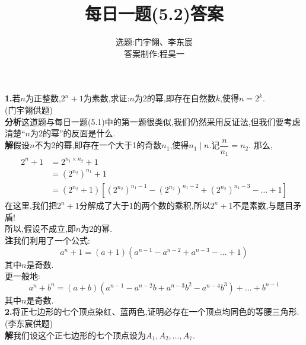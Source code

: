 \documentclass[UTF8]{ctexart}
\title{每日一题(5.2)答案}
\author{选题:门宇翎、李东宸\\答案制作:程昊一}
\begin{document}
\maketitle
\hspace*{2em}\textbf{1.}{若$n$为正整数,$2^n+1$为素数,求证:$n$为2的幂,即存在自然数$k$,使得$n=2^k$.\\(门宇翎供题)}\\
\hspace*{2em}\textbf{分析}\quad 这道题与每日一题(5.1)中的第一题很类似,我们仍然采用反证法,但我们要考虑清楚“$n$为2的幂”的反面是什么.\\
\hspace*{2em}\textbf{解}\quad 假设$n$不为2的幂,即存在一个大于1的奇数$n_1$,使得$n_1\mid n$.记$\dfrac{n}{n_1}=n_2$.
那么, 
\begin{align*}
	2^n+1&=2^{n_1\times n_2}+1\\
	&=(2^{n_2})^{n_1}+1\\
	&=(2^{n_2}+1)[(2^{n_2})^{n_1-1}-(2^{n_2})^{n_1-2}+(2^{n_2})^{n_1-3}-\dots+1]
\end{align*}
在这里,我们把$2^n+1$分解成了大于1的两个数的乘积,所以$2^n+1$不是素数,与题目矛盾!\\
\hspace*{2em}所以,假设不成立,即$n$为2的幂.\\
\hspace*{2em}\textbf{注}\quad 我们利用了一个公式:
\[a^n+1=(a+1)(a^{n-1}-a^{n-2}+a^{n-3}-\dots+1)\]
其中$n$是奇数.\\
\hspace*{2em}更一般地:
\[a^n+b^n=(a+b)(a^{n-1}-a^{n-2}b+a^{n-3}b^2-a^{n-4}b^3)+\dots+b^{n-1}\]
其中$n$是奇数.\\
\hspace*{2em}\textbf{2.}{将正七边形的七个顶点染红、蓝两色,证明必存在一个顶点均同色的等腰三角形.\\(李东宸供题)}\\
\hspace*{2em}\textbf{解}\quad 我们设这个正七边形的七个顶点设为$A_1,A_2,\dots,A_7$.\\
\begin{figure}[!ht]
	\centering

\end{figure}
\end{document}

